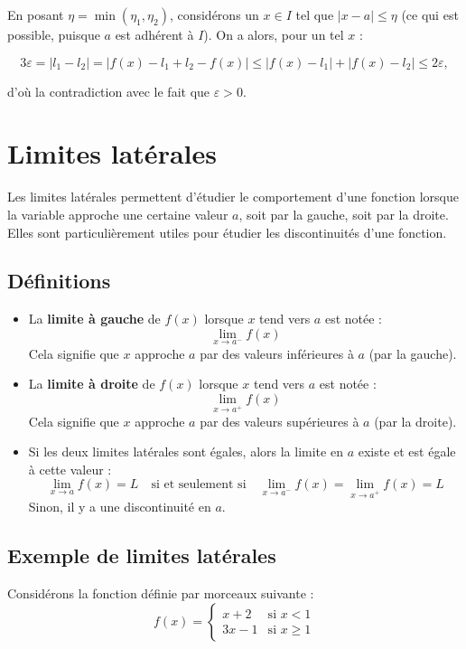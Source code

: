 \documentclass{article}
\begin{document}
	En posant $\eta = \min(\eta_1, \eta_2)$, considérons un $x \in I$ tel que $|x - a| \leq \eta$ (ce qui est possible, puisque $a$ est adhérent à $I$). On a alors, pour un tel $x$ :
	
	\[
	3\varepsilon = |l_1 - l_2| = |f(x) - l_1 + l_2 - f(x)| \leq |f(x) - l_1| + |f(x) - l_2| \leq 2\varepsilon,
	\]
	
	d'où la contradiction avec le fait que $\varepsilon > 0$.
\section{Limites latérales}

Les limites latérales permettent d'étudier le comportement d'une fonction lorsque la variable approche une certaine valeur \( a \), soit par la gauche, soit par la droite. Elles sont particulièrement utiles pour étudier les discontinuités d'une fonction.

\subsection{Définitions}

\begin{itemize}
	\item La \textbf{limite à gauche} de \( f(x) \) lorsque \( x \) tend vers \( a \) est notée :
	\[
	\lim_{x \to a^-} f(x)
	\]
	Cela signifie que \( x \) approche \( a \) par des valeurs inférieures à \( a \) (par la gauche).
	
	\item La \textbf{limite à droite} de \( f(x) \) lorsque \( x \) tend vers \( a \) est notée :
	\[
	\lim_{x \to a^+} f(x)
	\]
	Cela signifie que \( x \) approche \( a \) par des valeurs supérieures à \( a \) (par la droite).
	
	\item Si les deux limites latérales sont égales, alors la limite en \( a \) existe et est égale à cette valeur :
	\[
	\lim_{x \to a} f(x) = L \quad \text{si et seulement si} \quad \lim_{x \to a^-} f(x) = \lim_{x \to a^+} f(x) = L
	\]
	Sinon, il y a une discontinuité en \( a \).
\end{itemize}

\subsection{Exemple de limites latérales}

Considérons la fonction définie par morceaux suivante :
\[
f(x) =
\begin{cases}
	x + 2 & \text{si } x < 1 \\
	3x - 1 & \text{si } x \geq 1
\end{cases}
\]
\end{document}
